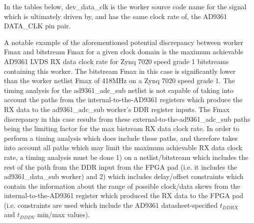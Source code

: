\documentclass{article}
\edef\ecomp{ad9361_adc_sub}
\begin{document}
\noindent In the tables below, dev\_data\_clk is the worker source code name for the signal which is ultimately driven by, and has the same clock rate of, the AD9361 DATA\_CLK pin pair. \\

%



\pagebreak
\noindent A notable example of the aforementioned potential discrepancy between worker Fmax and bitstream Fmax for a given clock domain is the maximum achievable AD9361 LVDS RX data clock rate for Zynq 7020 speed grade 1 bitstreams containing this worker. The bitstream Fmax in this case is significantly lower than the worker netlist Fmax of 418MHz on a Zynq 7020 speed grade 1. The timing analysis for the ad9361\_adc\_sub netlist is not capable of taking into account the paths from the internal-to-the-AD9361 registers which produce the RX data to the ad9361\_adc\_sub worker's DDR register inputs. The Fmax discrepancy in this case results from these external-to-the-ad9361\_adc\_sub paths being the limiting factor for the max bistream RX data clock rate. In order to perform a timing analysis which does include these paths, and therefore takes into account all paths which may limit the maximum achievable RX data clock rate, a timing analysis must be done 1) on a netlist/bitstream which includes the rest of the path from the DDR input from the FPGA pad (i.e. it includes the ad9361\_data\_sub worker) and 2) which includes delay/offset constraints which contain the information about the range of possible clock/data skews from the internal-to-the-AD9361 register which produced the RX data to the FPGA pad (i.e. constraints are used which include the AD9361 datasheet-specified $t_{DDRX}$ and $t_{DDDV}$ min/max values). \\
\end{document}
